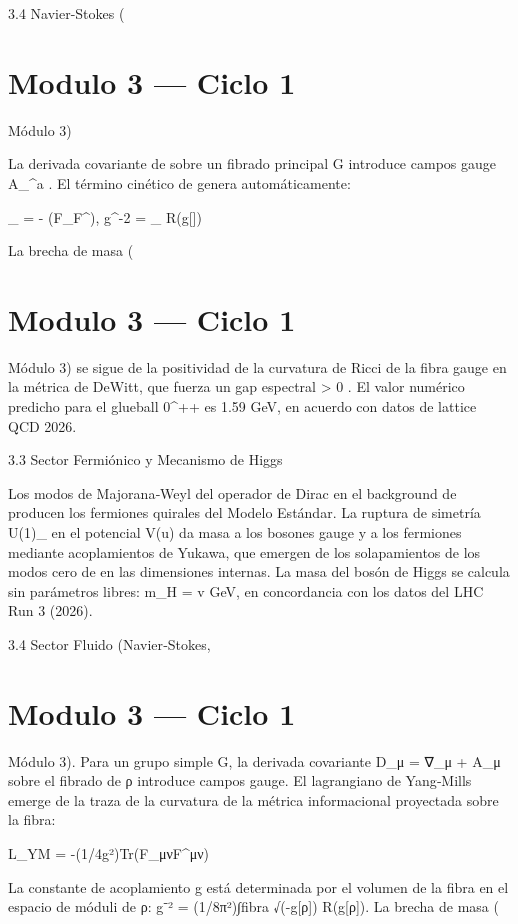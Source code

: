 \documentclass[12pt,twoside]{book}
\begin{document}
3.4 Navier-Stokes (

\chapter{Modulo 3 — Ciclo 1}
Módulo 3)

La derivada covariante de  \sqrt{\rho}  sobre un fibrado principal  G  introduce campos gauge  A_\mu^a . El término cinético de  \rho  genera automáticamente:

_{} = - (F_{\mu\nu}F^{\mu\nu}), \quad g^{-2} = \int_{}  R(g[\rho])

La brecha de masa (

\chapter{Modulo 3 — Ciclo 1}
Módulo 3) se sigue de la positividad de la curvatura de Ricci de la fibra gauge en la métrica de DeWitt, que fuerza un gap espectral  \Delta > 0 . El valor numérico predicho para el glueball  0^{++}  es  1.59   GeV, en acuerdo con datos de lattice QCD 2026.

3.3 Sector Fermiónico y Mecanismo de Higgs

Los modos de Majorana‑Weyl del operador de Dirac en el background de  \rho  producen los fermiones quirales del Modelo Estándar. La ruptura de simetría  U(1)_{}  en el potencial  V(u)  da masa a los bosones gauge y a los fermiones mediante acoplamientos de Yukawa, que emergen de los solapamientos de los modos cero de  \rho  en las dimensiones internas. La masa del bosón de Higgs se calcula sin parámetros libres:  m_H = \sqrt{2\lambda}v   GeV, en concordancia con los datos del LHC Run 3 (2026).

3.4 Sector Fluido (Navier‑Stokes, 

\chapter{Modulo 3 — Ciclo 1}
Módulo 3).
Para un grupo simple G, la derivada covariante D_μ = ∇_μ + A_μ sobre el fibrado de ρ introduce campos gauge. El lagrangiano de Yang‑Mills emerge de la traza de la curvatura de la métrica informacional proyectada sobre la fibra:

L_YM = -(1/4g²)Tr(F_{μν}F^{μν})

La constante de acoplamiento g está determinada por el volumen de la fibra en el espacio de móduli de ρ: g⁻² = (1/8π²)∫fibra √(-g[ρ]) R(g[ρ]). La brecha de masa (
\end{document}
